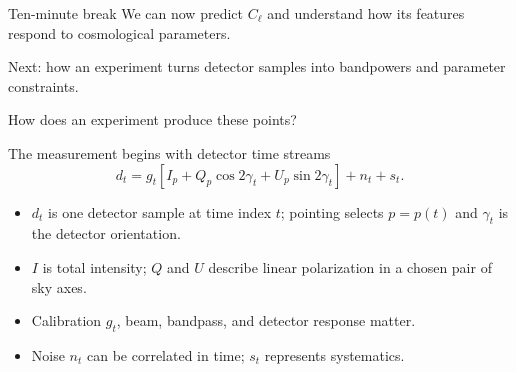\begin{frame}{Ten-minute break}
\vfill\Large We can now predict $C_\ell$ and understand how its features respond to cosmological parameters.
\medskip\par Next: how an experiment turns detector samples into bandpowers and parameter constraints.
\vfill
\end{frame}

\begin{frame}{How does an experiment produce these points?}
\begin{center}
\end{center}
\end{frame}

\begin{frame}{The measurement begins with detector time streams}
\[d_t=g_t[I_p+Q_p\cos2\gamma_t+U_p\sin2\gamma_t]+n_t+s_t.\]
\begin{itemize}
\item $d_t$ is one detector sample at time index $t$; pointing selects $p=p(t)$ and $\gamma_t$ is the detector orientation.
\item $I$ is total intensity; $Q$ and $U$ describe linear polarization in a chosen pair of sky axes.
\item Calibration $g_t$, beam, bandpass, and detector response matter.
\item Noise $n_t$ can be correlated in time; $s_t$ represents systematics.
\end{itemize}
\end{frame}

